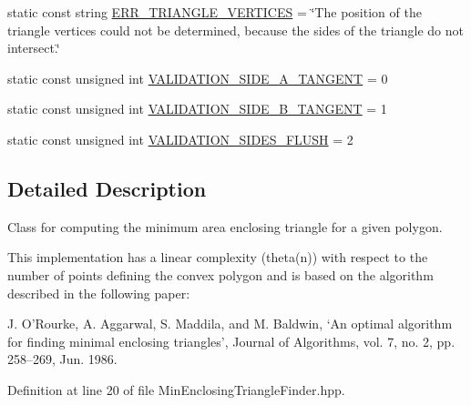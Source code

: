 \begin{DoxyCompactItemize}
\item 
static const string \hyperlink{classmultiscale_1_1MinEnclosingTriangleFinder_aefe21c593b616438f9fa3591625322aa}{\-E\-R\-R\-\_\-\-T\-R\-I\-A\-N\-G\-L\-E\-\_\-\-V\-E\-R\-T\-I\-C\-E\-S} = \char`\"{}\-The position of the triangle vertices could not be determined, because the sides of the triangle do not intersect.\char`\"{}
\item 
static const unsigned int \hyperlink{classmultiscale_1_1MinEnclosingTriangleFinder_a811859188bd18d46ee6906ad4d958b3a}{\-V\-A\-L\-I\-D\-A\-T\-I\-O\-N\-\_\-\-S\-I\-D\-E\-\_\-\-A\-\_\-\-T\-A\-N\-G\-E\-N\-T} = 0
\item 
static const unsigned int \hyperlink{classmultiscale_1_1MinEnclosingTriangleFinder_a672ce1fc349c975d0eec1e897e8a985d}{\-V\-A\-L\-I\-D\-A\-T\-I\-O\-N\-\_\-\-S\-I\-D\-E\-\_\-\-B\-\_\-\-T\-A\-N\-G\-E\-N\-T} = 1
\item 
static const unsigned int \hyperlink{classmultiscale_1_1MinEnclosingTriangleFinder_a600e164d85dad81a0e0bfa6f89796033}{\-V\-A\-L\-I\-D\-A\-T\-I\-O\-N\-\_\-\-S\-I\-D\-E\-S\-\_\-\-F\-L\-U\-S\-H} = 2
\end{DoxyCompactItemize}


\subsection{\-Detailed \-Description}
\-Class for computing the minimum area enclosing triangle for a given polygon. 

\-This implementation has a linear complexity (theta(n)) with respect to the number of points defining the convex polygon and is based on the algorithm described in the following paper\-:

\-J. \-O’\-Rourke, \-A. \-Aggarwal, \-S. \-Maddila, and \-M. \-Baldwin, ‘\-An optimal algorithm for finding minimal enclosing triangles’, \-Journal of \-Algorithms, vol. 7, no. 2, pp. 258–269, \-Jun. 1986. 

\-Definition at line 20 of file \-Min\-Enclosing\-Triangle\-Finder.\-hpp.



